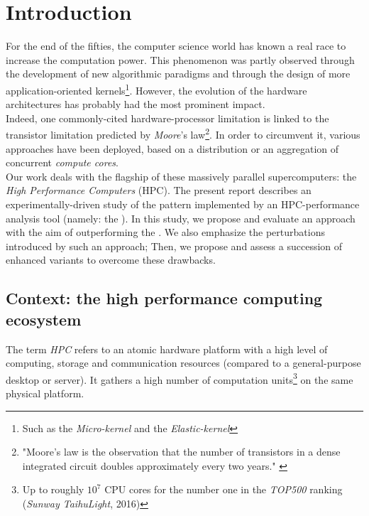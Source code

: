 





\chapter{Introduction}
	For the end of the fifties, the computer science world has known a real race to increase the computation power.   This phenomenon was partly observed through the development of new algorithmic paradigms and through the design of more application-oriented kernels\footnote{Such as the \emph{Micro-kernel} and the \emph{Elastic-kernel}}.   However, the evolution of the hardware architectures has probably had the most prominent impact.\\
	Indeed, one commonly-cited hardware-processor limitation is linked to the transistor limitation predicted by \emph{Moore}'s law\footnote{"Moore's law is the observation that the number of transistors in a dense integrated circuit doubles approximately every two years." \cite{intelMooreLow}}.   In order to circumvent it, various approaches have been deployed, based on a distribution or an aggregation of concurrent \emph{compute cores}.\\

	Our work deals with the flagship of these massively parallel supercomputers: the \emph{High Performance Computers} (HPC).   The present report describes an experimentally-driven study of the pattern implemented by an HPC-performance analysis tool (namely: the \toolTargetSoftware).   In this study, we propose and evaluate an \notationaio\space approach with the aim of outperforming the \toolTargetSoftware.   We also emphasize the perturbations introduced by such an approach;   Then, we propose and assess a succession of enhanced variants to overcome these drawbacks.\\


\section{Context: the high performance computing ecosystem}
	The term \emph{HPC} refers to an atomic hardware platform with a high level of computing, storage and communication resources (compared to a general-purpose desktop or server).   It gathers a high number of computation units\footnote{Up to roughly $10^{7}$ CPU cores for the number one in the \emph{TOP500} ranking (\emph{Sunway TaihuLight}, 2016)} on the same physical platform.\\

